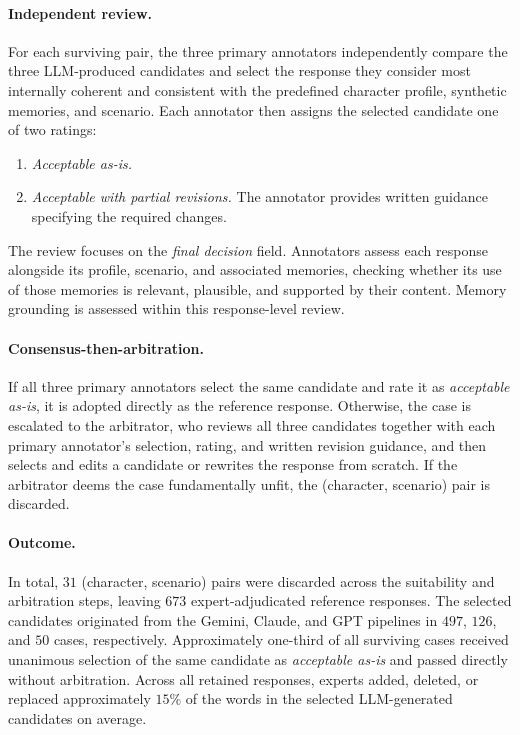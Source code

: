 \documentclass[11pt]{article}
\begin{document}
\paragraph{Independent review.} For each surviving pair, the three primary annotators independently compare the three LLM-produced candidates and select the response they consider most internally coherent and consistent with the predefined character profile, synthetic memories, and scenario. Each annotator then assigns the selected candidate one of two ratings:
\begin{enumerate}[leftmargin=1.5em, itemsep=2pt]
  \item \textit{Acceptable as-is.}
  \item \textit{Acceptable with partial revisions.} The annotator provides written guidance specifying the required changes.
\end{enumerate}
The review focuses on the \textit{final decision} field. Annotators assess each response alongside its profile, scenario, and associated memories, checking whether its use of those memories is relevant, plausible, and supported by their content. Memory grounding is assessed within this response-level review.

\paragraph{Consensus-then-arbitration.} If all three primary annotators select the same candidate and rate it as \textit{acceptable as-is}, it is adopted directly as the reference response. Otherwise, the case is escalated to the arbitrator, who reviews all three candidates together with each primary annotator's selection, rating, and written revision guidance, and then selects and edits a candidate or rewrites the response from scratch. If the arbitrator deems the case fundamentally unfit, the (character, scenario) pair is discarded.

\paragraph{Outcome.} In total, $31$ (character, scenario) pairs were discarded across the suitability and arbitration steps, leaving $673$ expert-adjudicated reference responses. The selected candidates originated from the Gemini, Claude, and GPT pipelines in $497$, $126$, and $50$ cases, respectively. Approximately one-third of all surviving cases received unanimous selection of the same candidate as \textit{acceptable as-is} and passed directly without arbitration. Across all retained responses, experts added, deleted, or replaced approximately $15\%$ of the words in the selected LLM-generated candidates on average.
\end{document}
